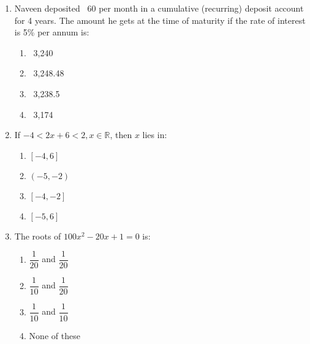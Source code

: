 \begin{enumerate}[label=(\roman*)]

    \item Naveen deposited \rupee~60 per month in a cumulative (recurring)
        deposit account for 4 years. The amount he gets at the time of maturity 
        if the rate of interest is 5\% per annum is:

        \begin{multicols}{2}
        \begin{enumerate}[label=(\alph*)]
            \item \rupee~3,240 
            \item \rupee~3,248.48
            \item \rupee~3,238.5
            \item \rupee~3,174
        \end{enumerate}
        \end{multicols}

    \newpage
    \item If $-4 < 2x + 6 < 2, x \in \mathbb{R}$, then $x$ lies in:

        \begin{multicols}{2}
        \begin{enumerate}[label=(\alph*)]
            \item $[-4, 6]$
            \item $(-5, -2)$
            \item $[-4, -2]$
            \item $[-5, 6]$
        \end{enumerate}
        \end{multicols}

    \item The roots of $100x^2 - 20x + 1 =0$ is:

        \begin{multicols}{2}
        \begin{enumerate}[label=(\alph*)]
            \item $\dfrac{1}{20}$ and $\dfrac{1}{20}$
            \item $\dfrac{1}{10}$ and $\dfrac{1}{20}$
            \item $\dfrac{1}{10}$ and $\dfrac{1}{10}$
            \item None of these
        \end{enumerate}
        \end{multicols}


\end{enumerate}
